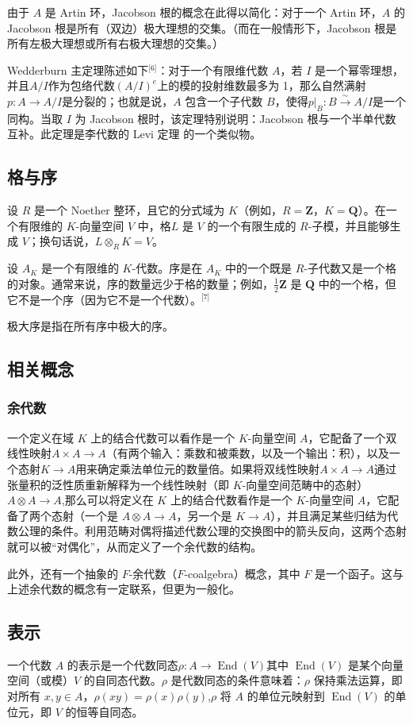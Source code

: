 由于 $A$ 是 Artin 环，Jacobson 根的概念在此得以简化：对于一个 Artin 环，$A$ 的 Jacobson 根是所有（双边）极大理想的交集。（而在一般情形下，Jacobson 根是所有左极大理想或所有右极大理想的交集。）

Wedderburn 主定理陈述如下\(^\text{[6]}\)：对于一个有限维代数 $A$，若 $I$ 是一个幂零理想，并且$A / I$作为包络代数$(A / I)^e$上的模的投射维数最多为 1，那么自然满射$p : A \to A / I$是分裂的；也就是说，$A$ 包含一个子代数 $B$，使得$p|_B : B \xrightarrow{\sim} A / I$是一个同构。当取 $I$ 为 Jacobson 根时，该定理特别说明：Jacobson 根与一个半单代数互补。此定理是李代数的 Levi 定理 的一个类似物。
\subsection{格与序}
设 $R$ 是一个 Noether 整环，且它的分式域为 $K$（例如，$R = \mathbf{Z}$，$K = \mathbf{Q}$）。在一个有限维的 $K$-向量空间 $V$ 中，格$L$ 是 $V$ 的一个有限生成的 $R$-子模，并且能够生成 $V$；换句话说，$L \otimes_R K = V$。

设 $A_K$ 是一个有限维的 $K$-代数。序是在 $A_K$ 中的一个既是 $R$-子代数又是一个格的对象。通常来说，序的数量远少于格的数量；例如，$\frac{1}{2} \mathbf{Z}$ 是 $\mathbf{Q}$ 中的一个格，但它不是一个序（因为它不是一个代数）。\(^\text{[7]}\)

极大序是指在所有序中极大的序。
\subsection{相关概念}
\subsubsection{余代数}
一个定义在域 $K$ 上的结合代数可以看作是一个 $K$-向量空间 $A$，它配备了一个双线性映射$A \times A \to A$（有两个输入：乘数和被乘数，以及一个输出：积），以及一个态射$K \to A$用来确定乘法单位元的数量倍。如果将双线性映射$A \times A \to A$通过张量积的泛性质重新解释为一个线性映射（即 $K$-向量空间范畴中的态射）$A \otimes A \to A$,那么可以将定义在 $K$ 上的结合代数看作是一个 $K$-向量空间 $A$，它配备了两个态射（一个是 $A \otimes A \to A$，另一个是 $K \to A$），并且满足某些归结为代数公理的条件。利用范畴对偶将描述代数公理的交换图中的箭头反向，这两个态射就可以被“对偶化”，从而定义了一个余代数的结构。

此外，还有一个抽象的 $F$-余代数（$F$-coalgebra）概念，其中 $F$ 是一个函子。这与上述余代数的概念有一定联系，但更为一般化。
\subsection{表示}
一个代数 $A$ 的表示是一个代数同态$\rho : A \to \operatorname{End}(V)$其中 $\operatorname{End}(V)$ 是某个向量空间（或模）$V$ 的自同态代数。$\rho$ 是代数同态的条件意味着：$\rho$ 保持乘法运算，即对所有 $x, y \in A$，$\rho(xy) = \rho(x)\rho(y)$,$\rho$ 将 $A$ 的单位元映射到 $\operatorname{End}(V)$ 的单位元，即 $V$ 的恒等自同态。

